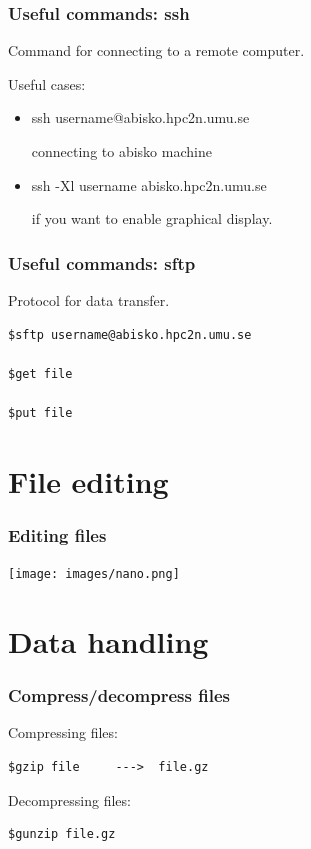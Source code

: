 \begin{frame}
	\frametitle{Useful commands: ssh}
Command for connecting to a remote computer.

Useful cases:
	\begin{itemize}
         \item ssh username@abisko.hpc2n.umu.se

         connecting to abisko machine

         \item ssh -Xl username abisko.hpc2n.umu.se

        if you want to enable graphical display.

	\end{itemize}
\end{frame}

\begin{frame}[fragile]
	\frametitle{Useful commands: sftp}

Protocol for data transfer.
\begin{verbatim}
$sftp username@abisko.hpc2n.umu.se

$get file

$put file

\end{verbatim}
\end{frame}

\section{File editing}

\begin{frame}
	\frametitle{Editing files}
        \begin{center}
        \texttt{[image: images/nano.png]}
        \end{center}
\end{frame}

\section{Data handling}

\begin{frame}[fragile]
	\frametitle{Compress/decompress files}

Compressing files:

\begin{verbatim}
$gzip file     --->  file.gz
\end{verbatim}

Decompressing files:

\begin{verbatim}
$gunzip file.gz
\end{verbatim}

\end{frame}

